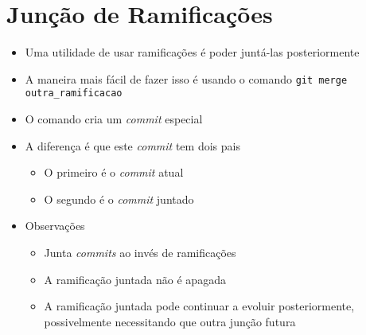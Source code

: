 \documentclass{beamer}
\newenvironment{slide}{\begin{frame}{\insertsection}}{\end{frame}}
\begin{document}
\section{Junção de Ramificações}
\begin{slide}
    \begin{itemize}
        \item Uma utilidade de usar ramificações é poder juntá-las
            posteriormente
        \pause
        \item A maneira mais fácil de fazer isso é usando o comando
            \texttt{git merge outra\_ramificacao}
        \pause
        \item O comando cria um \emph{commit} especial
        \pause
        \item A diferença é que este \emph{commit} tem dois pais
        \begin{itemize}
            \pause
            \item O primeiro é o \emph{commit} atual
            \pause
            \item O segundo é o \emph{commit} juntado
        \end{itemize}
        \pause
        \item Observações
        \begin{itemize}
            \pause
            \item Junta \emph{commits} ao invés de ramificações
            \pause
            \item A ramificação juntada não é apagada
            \pause
            \item A ramificação juntada pode continuar a evoluir posteriormente,
                possivelmente necessitando que outra junção futura
        \end{itemize}
    \end{itemize}
\end{slide}
\end{document}
